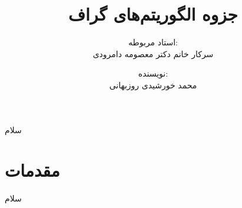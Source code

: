 \documentclass[a4paper,10pt]{book}
\title{\Huge جزوه الگوریتم‌های گراف}
\author{استاد مربوطه:\\سرکار خانم دکتر معصومه دامرودی}
\date{نویسنده:\\محمد خورشیدی روزبهانی}
\begin{document}
    \maketitle

    سلام

    \tableofcontents

    \chapter{مقدمات}

        سلام
\end{document}
